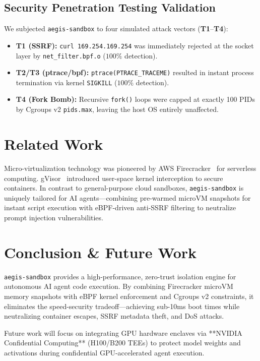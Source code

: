 \documentclass[10pt,twocolumn,a4paper]{article}
\begin{document}
\subsection{Security Penetration Testing Validation}
We subjected \texttt{aegis-sandbox} to four simulated attack vectors (\textbf{T1}--\textbf{T4}):
\begin{itemize}
    \item \textbf{T1 (SSRF):} \texttt{curl 169.254.169.254} was immediately rejected at the socket layer by \texttt{net\_filter.bpf.o} ($100\%$ detection).
    \item \textbf{T2/T3 (ptrace/bpf):} \texttt{ptrace(PTRACE\_TRACEME)} resulted in instant process termination via kernel \texttt{SIGKILL} ($100\%$ detection).
    \item \textbf{T4 (Fork Bomb):} Recursive \texttt{fork()} loops were capped at exactly 100 PIDs by Cgroups v2 \texttt{pids.max}, leaving the host OS entirely unaffected.
\end{itemize}

\section{Related Work}
Micro-virtualization technology was pioneered by AWS Firecracker~\cite{firecracker} for serverless computing. gVisor~\cite{gvisor} introduced user-space kernel interception to secure containers. In contrast to general-purpose cloud sandboxes, \texttt{aegis-sandbox} is uniquely tailored for AI agents—combining pre-warmed microVM snapshots for instant script execution with eBPF-driven anti-SSRF filtering to neutralize prompt injection vulnerabilities.

\section{Conclusion \& Future Work}
\texttt{aegis-sandbox} provides a high-performance, zero-trust isolation engine for autonomous AI agent code execution. By combining Firecracker microVM memory snapshots with eBPF kernel enforcement and Cgroups v2 constraints, it eliminates the speed-security tradeoff—achieving sub-10ms boot times while neutralizing container escapes, SSRF metadata theft, and DoS attacks. 

Future work will focus on integrating GPU hardware enclaves via **NVIDIA Confidential Computing** (H100/B200 TEEs) to protect model weights and activations during confidential GPU-accelerated agent execution.
\end{document}
